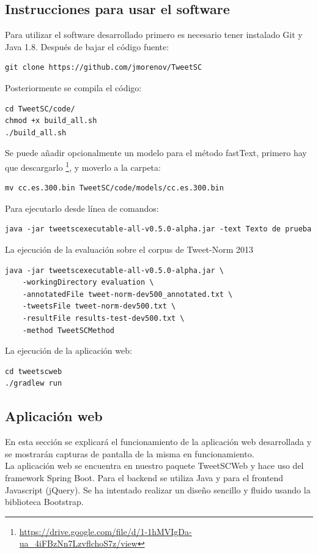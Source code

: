 \documentclass[spanish,12pt, a4paper,twoside]{paper}
\begin{document}
\newpage
\subsection{Instrucciones para usar el software}\label{sec:instruccionesparausarelsoftware}
Para utilizar el software desarrollado primero es necesario tener instalado Git y Java 1.8. Después de bajar el código fuente: 
\begin{verbatim}
git clone https://github.com/jmorenov/TweetSC
\end{verbatim}
Posteriormente se compila el código: 
\begin{verbatim}
cd TweetSC/code/
chmod +x build_all.sh
./build_all.sh
\end{verbatim}
Se puede añadir opcionalmente un modelo para el método fastText, primero hay que descargarlo \footnote{\url{https://drive.google.com/file/d/1-1hMVIgDa-ua_4iFBzNn7LzvflchoS7z/view}}, y moverlo a la carpeta:
\begin{verbatim}
mv cc.es.300.bin TweetSC/code/models/cc.es.300.bin
\end{verbatim}
Para ejecutarlo desde línea de comandos:
\begin{verbatim}
java -jar tweetscexecutable-all-v0.5.0-alpha.jar -text Texto de prueba
\end{verbatim}
La ejecución de la evaluación sobre el corpus de Tweet-Norm 2013 \cite{alegria:2013}
\begin{verbatim}
java -jar tweetscexecutable-all-v0.5.0-alpha.jar \
    -workingDirectory evaluation \
    -annotatedFile tweet-norm-dev500_annotated.txt \
    -tweetsFile tweet-norm-dev500.txt \
    -resultFile results-test-dev500.txt \
    -method TweetSCMethod
\end{verbatim}
La ejecución de la aplicación web:
\begin{verbatim}
cd tweetscweb
./gradlew run
\end{verbatim}

\subsection{Aplicación web}\label{sec:aplicacionweb}
En esta sección se explicará el funcionamiento de la aplicación web desarrollada y se mostrarán capturas de pantalla de la misma en funcionamiento.\\

La aplicación web se encuentra en nuestro paquete TweetSCWeb y hace uso del framework Spring Boot. Para el backend se utiliza Java y para el frontend Javascript (jQuery). Se ha intentado realizar un diseño sencillo y fluido usando la biblioteca Bootstrap.\\
\end{document}
